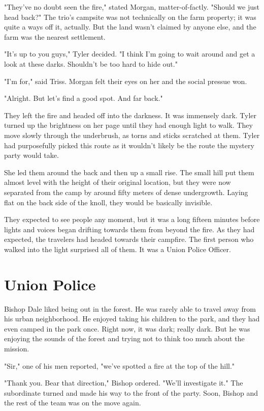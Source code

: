 \documentclass[courier]{sffms}
\begin{document}
"They've no doubt seen the fire," stated Morgan,
matter-of-factly. "Should we just head back?" The
trio's campsite was not technically on the farm
property; it was quite a ways off it, actually. But
the land wasn't claimed by anyone else, and the
farm was the nearest settlement.

"It's up to you guys," Tyler decided. "I think I'm
going to wait around and get a look at these 
darks. Shouldn't be too hard to hide out."

"I'm for," said Triss. Morgan felt their eyes on her
and the social pressue won.

"Alright. But let's find a good spot. And far back."

They left the fire and headed off into the darkness.
It was immensely dark. Tyler turned up the
brightness on her page until they had 
enough light to walk.
They move slowly through the underbrush,
as torns and sticks scratched at them.
Tyler had purposefully picked this route as it
wouldn't likely be the route the mystery
party would take.

She led them around the back and then up
a small rise. The small hill put them almost
level with the height of their original location,
but they were now separated from the camp
by around fifty meters of dense undergrowth.
Laying flat on the back side of the knoll, they
would be basically invisible.

They expected to see people any moment,
but it was a long fifteen minutes before lights
and voices began drifting towards them from
beyond the fire. As they had expected, the
travelers had headed towards their campfire.
The first person who walked into the light
surprised all of them. It was a Union Police
Officer.

\chapter{Union Police}
Bishop Dale liked being out in the forest. He
was rarely able to travel away from his urban
neighborhood. He enjoyed taking his children
to the park, and they had even camped in the
park once. Right now, it was dark; really dark.
But he was enjoying the sounds of the forest
and trying not to think too much about the
mission.

"Sir," one of his men reported, 
"we've spotted a fire at the top of the hill."

"Thank you. Bear that direction," Bishop
ordered. "We'll
investigate it." The subordinate turned and
made his way to the front of the party. Soon,
Bishop and the rest of the team was on
the move again.
\end{document}
